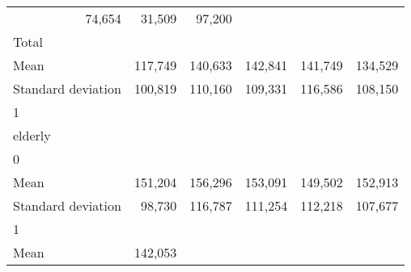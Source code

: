 \begin{tabular}{llllll}
  \multicolumn{1}{r}{74,654} &
  \multicolumn{1}{r}{31,509} &
  \multicolumn{1}{r}{97,200} \\
\multicolumn{1}{l}{\hspace{3em}Total} &
  \multicolumn{1}{|r}{} &
  \multicolumn{1}{r}{} &
  \multicolumn{1}{r}{} &
  \multicolumn{1}{r}{} &
  \multicolumn{1}{r}{} \\
\multicolumn{1}{l}{\hspace{4em}Mean} &
  \multicolumn{1}{|r}{117,749} &
  \multicolumn{1}{r}{140,633} &
  \multicolumn{1}{r}{142,841} &
  \multicolumn{1}{r}{141,749} &
  \multicolumn{1}{r}{134,529} \\
\multicolumn{1}{l}{\hspace{4em}Standard deviation} &
  \multicolumn{1}{|r}{100,819} &
  \multicolumn{1}{r}{110,160} &
  \multicolumn{1}{r}{109,331} &
  \multicolumn{1}{r}{116,586} &
  \multicolumn{1}{r}{108,150} \\
\multicolumn{1}{l}{\hspace{1em}1} &
  \multicolumn{1}{|r}{} &
  \multicolumn{1}{r}{} &
  \multicolumn{1}{r}{} &
  \multicolumn{1}{r}{} &
  \multicolumn{1}{r}{} \\
\multicolumn{1}{l}{\hspace{2em}elderly} &
  \multicolumn{1}{|r}{} &
  \multicolumn{1}{r}{} &
  \multicolumn{1}{r}{} &
  \multicolumn{1}{r}{} &
  \multicolumn{1}{r}{} \\
\multicolumn{1}{l}{\hspace{3em}0} &
  \multicolumn{1}{|r}{} &
  \multicolumn{1}{r}{} &
  \multicolumn{1}{r}{} &
  \multicolumn{1}{r}{} &
  \multicolumn{1}{r}{} \\
\multicolumn{1}{l}{\hspace{4em}Mean} &
  \multicolumn{1}{|r}{151,204} &
  \multicolumn{1}{r}{156,296} &
  \multicolumn{1}{r}{153,091} &
  \multicolumn{1}{r}{149,502} &
  \multicolumn{1}{r}{152,913} \\
\multicolumn{1}{l}{\hspace{4em}Standard deviation} &
  \multicolumn{1}{|r}{98,730} &
  \multicolumn{1}{r}{116,787} &
  \multicolumn{1}{r}{111,254} &
  \multicolumn{1}{r}{112,218} &
  \multicolumn{1}{r}{107,677} \\
\multicolumn{1}{l}{\hspace{3em}1} &
  \multicolumn{1}{|r}{} &
  \multicolumn{1}{r}{} &
  \multicolumn{1}{r}{} &
  \multicolumn{1}{r}{} &
  \multicolumn{1}{r}{} \\
\multicolumn{1}{l}{\hspace{4em}Mean} &
  \multicolumn{1}{|r}{142,053} &

\end{tabular}
